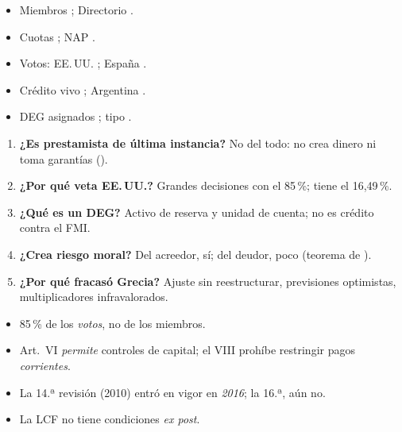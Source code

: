 \documentclass{article}
\begin{document}
\begin{columnas}
\anexorepaso
{}
\begin{itemize}
\item Miembros ; Directorio .
\item Cuotas ; NAP .
\item Votos: EE.\,UU. ; España .
\item Crédito vivo ; Argentina .
\item DEG asignados ; tipo .
\end{itemize}
\begin{enumerate}
\item \textbf{¿Es prestamista de última instancia?} No del todo: no crea dinero ni toma garantías ().
\item \textbf{¿Por qué veta EE.\,UU.?} Grandes decisiones con el 85\,\%; tiene el 16,49\,\%.
\item \textbf{¿Qué es un DEG?} Activo de reserva y unidad de cuenta; no es crédito contra el FMI.
\item \textbf{¿Crea riesgo moral?} Del acreedor, sí; del deudor, poco (teorema de ).
\item \textbf{¿Por qué fracasó Grecia?} Ajuste sin reestructurar, previsiones optimistas, multiplicadores infravalorados.
\end{enumerate}
\begin{trampa}
\begin{itemize}
\item 85\,\% de los \emph{votos}, no de los miembros.
\item Art.~VI \emph{permite} controles de capital; el VIII prohíbe restringir pagos \emph{corrientes}.
\item La 14.ª revisión (2010) entró en vigor en \emph{2016}; la 16.ª, aún no.
\item La LCF no tiene condiciones \emph{ex post}.
\end{itemize}
\end{trampa}

\end{columnas}
\end{document}
